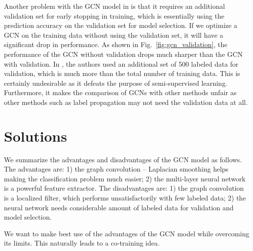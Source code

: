 \documentclass[letterpaper]{article} \usepackage{aaai18}  \usepackage{times}  \usepackage{helvet}  \usepackage{courier}  \usepackage{url}  \usepackage{graphicx}  \usepackage{algorithm}
\begin{document}
Another problem with the GCN model in \cite{kipf2016semi} is that it requires an additional validation set for early stopping in training, which is essentially using the prediction accuracy on the validation set  for model selection. If we optimize a GCN on the training data without using the validation set, it will have a significant drop in performance. As shown in Fig.~\ref{fig:gcn_validation}, the performance of the GCN without validation drops much sharper than the GCN with validation. In \cite{kipf2016semi}, the authors used an additional set of 500 labeled data for validation, which is much more than the total number of training data. This is certainly undesirable as it defeats the purpose of semi-supervised learning. Furthermore, it makes the comparison of GCNs with other methods unfair as other methods such as label propagation may not need the validation data at all.



































\section{Solutions}\label{sec:Solution}

We summarize the advantages and disadvantages of the GCN model as follows. The advantages are: 1) the graph convolution -- Laplacian smoothing helps making the classification problem much easier; 2) the multi-layer neural network is a powerful feature extractor. The disadvantages are: 1) the graph convolution is a localized filter, which performs unsatisfactorily with few labeled data; 2) the neural network needs considerable amount of labeled data for validation and model selection.



We want to make best use of the advantages of the GCN model while overcoming its limits. This naturally leads to a co-training \cite{blum1998combining} idea.
\end{document}
